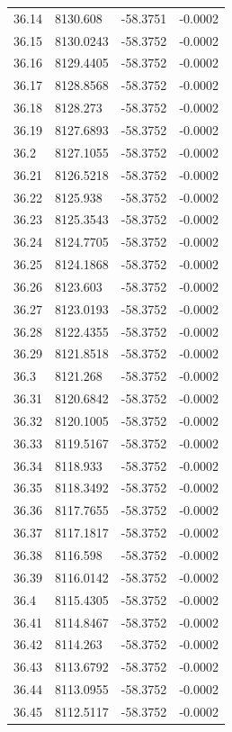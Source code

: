 \begin{table}[H]
\begin{tabular}{llll}
36.14 & 8130.608 & -58.3751 & -0.0002 \\
36.15 & 8130.0243 & -58.3752 & -0.0002 \\
36.16 & 8129.4405 & -58.3752 & -0.0002 \\
36.17 & 8128.8568 & -58.3752 & -0.0002 \\
36.18 & 8128.273 & -58.3752 & -0.0002 \\
36.19 & 8127.6893 & -58.3752 & -0.0002 \\
36.2 & 8127.1055 & -58.3752 & -0.0002 \\
36.21 & 8126.5218 & -58.3752 & -0.0002 \\
36.22 & 8125.938 & -58.3752 & -0.0002 \\
36.23 & 8125.3543 & -58.3752 & -0.0002 \\
36.24 & 8124.7705 & -58.3752 & -0.0002 \\
36.25 & 8124.1868 & -58.3752 & -0.0002 \\
36.26 & 8123.603 & -58.3752 & -0.0002 \\
36.27 & 8123.0193 & -58.3752 & -0.0002 \\
36.28 & 8122.4355 & -58.3752 & -0.0002 \\
36.29 & 8121.8518 & -58.3752 & -0.0002 \\
36.3 & 8121.268 & -58.3752 & -0.0002 \\
36.31 & 8120.6842 & -58.3752 & -0.0002 \\
36.32 & 8120.1005 & -58.3752 & -0.0002 \\
36.33 & 8119.5167 & -58.3752 & -0.0002 \\
36.34 & 8118.933 & -58.3752 & -0.0002 \\
36.35 & 8118.3492 & -58.3752 & -0.0002 \\
36.36 & 8117.7655 & -58.3752 & -0.0002 \\
36.37 & 8117.1817 & -58.3752 & -0.0002 \\
36.38 & 8116.598 & -58.3752 & -0.0002 \\
36.39 & 8116.0142 & -58.3752 & -0.0002 \\
36.4 & 8115.4305 & -58.3752 & -0.0002 \\
36.41 & 8114.8467 & -58.3752 & -0.0002 \\
36.42 & 8114.263 & -58.3752 & -0.0002 \\
36.43 & 8113.6792 & -58.3752 & -0.0002 \\
36.44 & 8113.0955 & -58.3752 & -0.0002 \\
36.45 & 8112.5117 & -58.3752 & -0.0002 \\

\end{tabular}
\end{table}
